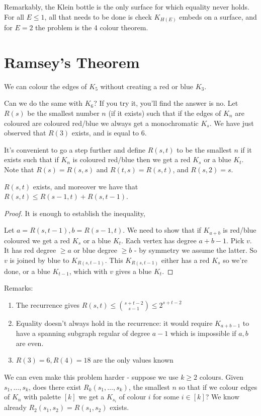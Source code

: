 \documentclass[10pt,a4paper]{article}
\begin{document}
Remarkably, the Klein bottle is the only surface for which equality never holds. For all $E \leq 1$, all that needs to be done is check $K_{H(E)}$ embeds on a surface, and for $E=2$ the problem is the 4 colour theorem.

\section{Ramsey's Theorem}
We can colour the edges of $K_5$ without creating a red or blue $K_3$.
\begin{center}
\end{center}
Can we do the same with $K_6$? If you try it, you'll find the answer is no. Let $R(s)$ be the smallest number $n$ (if it exists) such that if the edges of $K_n$ are coloured are coloured red/blue we always get a monochromatic $K_s$. We have just observed that $R(3)$ exists, and is equal to $6$.

It's convenient to go a step further and define $R(s,t)$ to be the smallest $n$ if it exists such that if $K_n$ is coloured red/blue then we get a red $K_s$ or a blue $K_t$. Note that $R(s) = R(s,s)$ and $R(t,s) = R(s,t)$, and $R(s,2) = s$.

\begin{theorem}
$R(s,t)$ exists, and moreover we have that $R(s,t) \leq R(s-1,t) + R(s,t-1)$.
\end{theorem}
\begin{proof}
It is enough to establish the inequality,

Let $a = R(s,t-1), b = R(s-1,t)$. We need to show that if $K_{a+b}$ is red/blue coloured we get a red $K_s$ or a blue $K_t$. Each vertex has degree $a+b-1$. Pick $v$. It has red degree $\geq a$ or blue degree $\geq b$ - by symmetry we assume the latter. So $v$ is joined by blue to $K_{R(s,t-1)}$. This $K_{R(s,t-1)}$ either has a red $K_s$ so we're done, or a blue $K_{t-1}$, which with $v$ gives a blue $K_t$. 
\end{proof}
Remarks:
\begin{enumerate}
\item The recurrence gives $R(s,t) \leq \binom{s+t-2}{s-1}\leq 2^{s+t-2}$
\item Equality doesn't always hold in the recurrence: it would require $K_{a+b-1}$ to have a spanning subgraph regular of degree $a-1$ which is impossible if $a,b$ are even. 
\item $R(3) = 6, R(4) = 18$ are the only values known
\end{enumerate}
We can even make this problem harder - suppose we use $k \geq 2$ colours. Given $s_1, \ldots, s_k$, does there exist $R_k(s_1,\ldots, s_k)$, the smallest $n$ so that if we colour edges of $K_n$ with palette $[k]$ we get a $K_{s_i}$ of colour $i$ for some $i \in [k]$? We know already $R_2(s_1,s_2) = R(s_1,s_2)$ exists.
\end{document}
